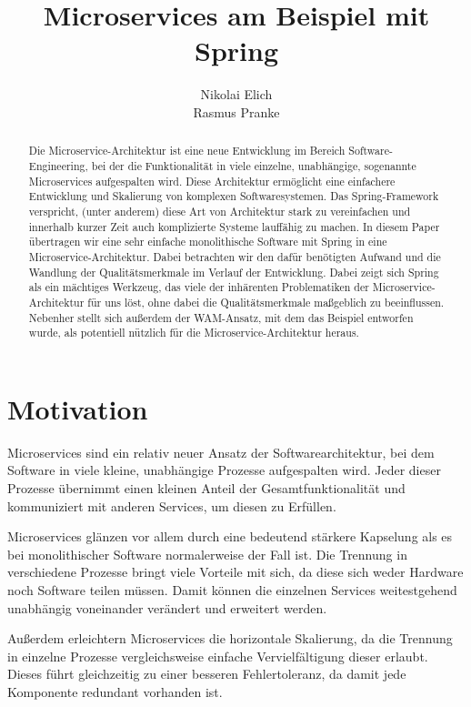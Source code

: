 \documentclass{article}
\author{Nikolai Elich \\ Rasmus Pranke}
\title{Microservices am Beispiel mit Spring}
\begin{document}
\maketitle

\begin{abstract}
Die Microservice-Architektur ist eine neue Entwicklung im Bereich Software-Engineering, bei der die Funktionalität in viele einzelne, unabhängige, sogenannte Microservices aufgespalten wird.
Diese Architektur ermöglicht eine einfachere Entwicklung und Skalierung von komplexen Softwaresystemen.
Das Spring-Framework verspricht, (unter anderem) diese Art von Architektur stark zu vereinfachen und innerhalb kurzer Zeit auch komplizierte Systeme lauffähig zu machen.
In diesem Paper übertragen wir eine sehr einfache monolithische Software mit Spring in eine Microservice-Architektur.
Dabei betrachten wir den dafür benötigten Aufwand und die Wandlung der Qualitätsmerkmale im Verlauf der Entwicklung.
Dabei zeigt sich Spring als ein mächtiges Werkzeug, das viele der inhärenten Problematiken der Microservice-Architektur für uns löst, ohne dabei die Qualitätsmerkmale maßgeblich zu beeinflussen.
Nebenher stellt sich außerdem der WAM-Ansatz, mit dem das Beispiel entworfen wurde, als potentiell nützlich für die Microservice-Architektur heraus.
\end{abstract}

\pagebreak

\tableofcontents

\pagebreak

\section{Motivation}

Microservices sind ein relativ neuer Ansatz der Softwarearchitektur, bei dem Software in viele kleine, unabhängige Prozesse aufgespalten wird.
Jeder dieser Prozesse übernimmt einen kleinen Anteil der Gesamtfunktionalität und kommuniziert mit anderen Services, um diesen zu Erfüllen.\cite{OMA}

Microservices glänzen vor allem durch eine bedeutend stärkere Kapselung als es bei monolithischer Software normalerweise der Fall ist.
Die Trennung in verschiedene Prozesse bringt viele Vorteile mit sich, da diese sich weder Hardware noch Software teilen müssen.
Damit können die einzelnen Services weitestgehend unabhängig voneinander verändert und erweitert werden.\cite{EMMA}

Außerdem erleichtern Microservices die horizontale Skalierung, da die Trennung in einzelne Prozesse vergleichsweise einfache Vervielfältigung dieser erlaubt.
Dieses führt gleichzeitig zu einer besseren Fehlertoleranz, da damit jede Komponente redundant vorhanden ist.\cite{OMA}
\end{document}
